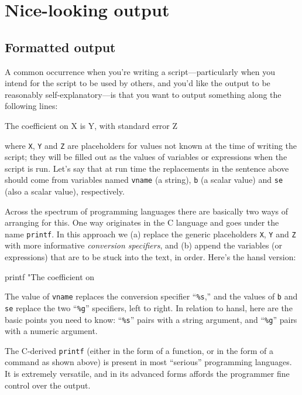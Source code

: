 \chapter{Nice-looking output}
\label{chap:formatting}

\section{Formatted output}
\label{sec:printf}

A common occurrence when you're writing a script---particularly when
you intend for the script to be used by others, and you'd like the
output to be reasonably self-explanatory---is that you want to output
something along the following lines:
\begin{code}
The coefficient on X is Y, with standard error Z
\end{code}
where \texttt{X}, \texttt{Y} and \texttt{Z} are placeholders for
values not known at the time of writing the script; they will be
filled out as the values of variables or expressions when the script
is run. Let's say that at run time the replacements in the sentence
above should come from variables named \texttt{vname} (a string),
\texttt{b} (a scalar value) and \texttt{se} (also a scalar value),
respectively.

Across the spectrum of programming languages there are basically two
ways of arranging for this. One way originates in the \textsf{C}
language and goes under the name \texttt{printf}. In this approach we
(a) replace the generic placeholders \texttt{X}, \texttt{Y} and
\texttt{Z} with more informative \textit{conversion specifiers}, and
(b) append the variables (or expressions) that are to be stuck into
the text, in order. Here's the hansl version:
\begin{code}
printf "The coefficient on %
\end{code}
The value of \texttt{vname} replaces the conversion specifier
``\texttt{\%s},'' and the values of \texttt{b} and \texttt{se} replace
the two ``\texttt{\%g}'' specifiers, left to right. In relation to
hansl, here are the basic points you need to know: ``\texttt{\%s}''
pairs with a string argument, and ``\texttt{\%g}'' pairs with a
numeric argument.

The \textsf{C}-derived \texttt{printf} (either in the form of a
function, or in the form of a command as shown above) is present in
most ``serious'' programming languages. It is extremely versatile, and
in its advanced forms affords the programmer fine control over
the output.

